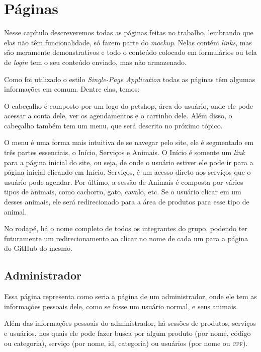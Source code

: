\chapter{Páginas}
Nesse capítulo descreveremos todas as páginas feitas no trabalho, lembrando
que elas não têm funcionalidade, só fazem parte do \emph{mockup}. Nelas contém
\emph{links}, mas são meramente demonstrativos e todo o conteúdo colocado em
formulários ou tela de \emph{login} tem o seu conteúdo enviado, mas não
armazenado.

Como foi utilizado o estilo \emph{Single-Page Application} todas as páginas têm
algumas informações em comum. Dentre elas, temos:
\begin{description}[style=nextline]
	\item [Cabeçalho]	O cabeçalho é composto por um logo do petshop, área do
						usuário, onde ele pode acessar a conta dele, ver os
						agendamentos e o carrinho dele. Além disso, o cabeçalho
						também tem um menu, que será descrito no próximo tópico.
	\item [Menu]		O menu é uma forma mais intuitiva de se navegar pelo site,
						ele é segmentado em três partes essenciais, o Início,
						Serviços e Animais. O Início é somente um \emph{link} para
						a página inicial do site, ou seja, de onde o usuário estiver
						ele pode ir para a página inicial clicando em Início.
						Serviços, é um acesso direto aos serviços que o usuário pode
						agendar. Por último, a sessão de Animais é composta por
						vários tipos de animais, como cachorro, gato, cavalo, etc.
						Se o usuário clicar em um desses animais, ele será
						redirecionado para a área de produtos para esse tipo de animal.
	\item [Rodapé]		No rodapé, há o nome completo de todos os integrantes do grupo,
						podendo ter futuramente um redirecionamento ao clicar no nome
						de cada um para a página do	GitHub do mesmo.
\end{description}

\section{Administrador}
Essa página representa como seria a página de um administrador, onde ele tem
as informações pessoais dele, como se fosse um usuário normal, e seus animais.

Além das informações pessoais do administrador, há sessões de produtos,
serviços e usuários, nos quais ele pode fazer busca por algum produto (por nome,
código ou categoria), serviço (por nome, id, categoria) ou usuários (por nome ou
\textsc{cpf}).

